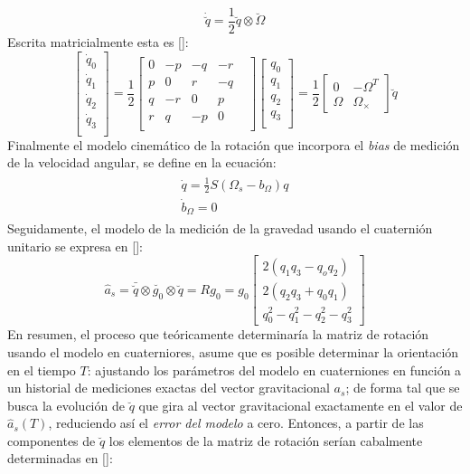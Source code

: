 \documentclass[10pt]{report}
\numberwithin{equation}{chapter}
\numberwithin{algorithm}{chapter}
\newcommand{\bcite}[1]{[\cite{#1}]}
\begin{document}
\begin{equation}
\dot{\breve{q}}=\frac{1}{2}\breve{q}\otimes\breve{\Omega}
\end{equation}
Escrita matricialmente esta es \bcite{Zhong2002}:
\begin{equation}\label{modelo_ecc7}
\begin{bmatrix}\dot{q}_0\\\dot{q}_1\\\dot{q}_2\\\dot{q}_3\\ \end{bmatrix}= \frac{1}{2}\begin{bmatrix} 0&-p&-q&-r\\ p&0&r&-q\\ q&-r&0&p&\\ r& q&-p&0\\ \end{bmatrix} 
\begin{bmatrix} q_0\\q_1\\q_2\\q_3\\ \end{bmatrix}= \frac{1}{2}\begin{bmatrix} 0&-\Omega^T\\ \Omega&\Omega_\times \end{bmatrix}\breve{q}
\end{equation}
Finalmente el modelo cinemático de la rotación que incorpora el \emph{bias} de medición de la velocidad angular, se define en la ecuación: 
\begin{gather}\label{chap2:ModeloProceso}
\begin{array}{c}
\dot{q}=\frac{1}{2}S(\Omega_s-b_{\Omega})q\\
\dot{b}_\Omega=0
\end{array}
\end{gather}
Seguidamente, el modelo de la medición de la gravedad usando el cuaternión unitario se expresa en \bcite{Sola2012}:
\begin{equation}\label{chap2:ModeloMedicion}
\hat{a}_s=\bar{\breve{q}}\otimes\breve{g_0}\otimes\breve{q}=Rg_0=g_0\begin{bmatrix}2(q_1q_3-q_oq_2)\\2(q_2q_3+q_0q_1)\\q_0^2-q_1^2-q_2^2-q_3^2\end{bmatrix}
\end{equation}
En resumen, el proceso que teóricamente determinaría la matriz de rotación usando el modelo en cuaterniores, asume que es posible determinar la orientación en el tiempo $T$: ajustando los parámetros del modelo en cuaterniones en función a un historial de mediciones exactas del vector gravitacional $a_s$; de forma tal que se busca la evolución de $\breve{q}$ que gira al vector gravitacional exactamente en el valor de $\hat{a}_s(T)$, reduciendo así el \emph{error del modelo} a cero. Entonces, a partir de las componentes de $\breve{q}$ los elementos de la matriz de rotación serían cabalmente determinadas en \bcite{Sola2012}:
\end{document}
